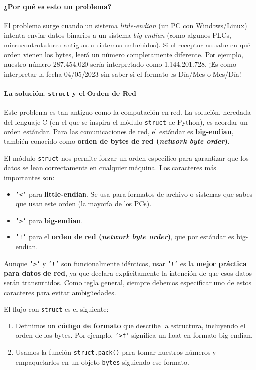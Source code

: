 \paragraph{¿Por qué es esto un problema?}
El problema surge cuando un sistema \textit{little-endian} (un PC con Windows/Linux) intenta enviar datos binarios a un sistema \textit{big-endian} (como algunos PLCs, microcontroladores antiguos o sistemas embebidos). Si el receptor no sabe en qué orden vienen los bytes, leerá un número completamente diferente. Por ejemplo, nuestro número 287.454.020 sería interpretado como 1.144.201.728. ¡Es como interpretar la fecha 04/05/2023 sin saber si el formato es Día/Mes o Mes/Día!

\paragraph{La solución: \texttt{struct} y el Orden de Red}
Este problema es tan antiguo como la computación en red. La solución, heredada del lenguaje C (en el que se inspira el módulo \texttt{struct} de Python), es acordar un orden estándar. Para las comunicaciones de red, el estándar es \textbf{big-endian}, también conocido como \textbf{orden de bytes de red (\textit{network byte order})}.

El módulo \texttt{struct} nos permite forzar un orden específico para garantizar que los datos se lean correctamente en cualquier máquina. Los caracteres más importantes son:
\begin{itemize}
    \item \texttt{'<'} para \textbf{little-endian}. Se usa para formatos de archivo o sistemas que sabes que usan este orden (la mayoría de los PCs).
    \item \texttt{'>'} para \textbf{big-endian}.
    \item \texttt{'!'} para el \textbf{orden de red (\textit{network byte order})}, que por estándar es big-endian.
\end{itemize}
Aunque \texttt{'>'} y \texttt{'!'} son funcionalmente idénticos, usar \texttt{'!'} es la \textbf{mejor práctica para datos de red}, ya que declara explícitamente la intención de que esos datos serán transmitidos. Como regla general, siempre debemos especificar uno de estos caracteres para evitar ambigüedades.


El flujo con \texttt{struct} es el siguiente:
\begin{enumerate}
    \item Definimos un \textbf{código de formato} que describe la estructura, incluyendo el orden de los bytes. Por ejemplo, \texttt{'>f'} significa un float en formato big-endian.
    \item Usamos la función \texttt{struct.pack()} para tomar nuestros números y empaquetarlos en un objeto \texttt{bytes} siguiendo ese formato.
\end{enumerate}


